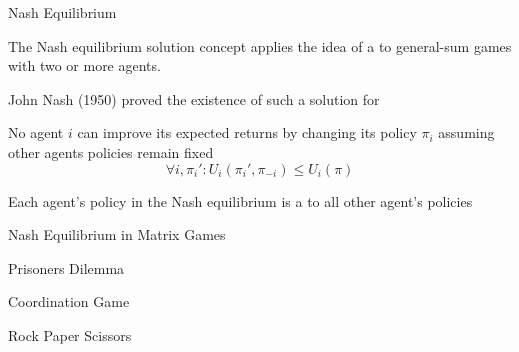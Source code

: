 \begin{frame}{Nash Equilibrium}

    The Nash equilibrium solution concept applies the idea of a  to general-sum games with two or more agents.
    \vspace{2pt}
    \blist
        \item John Nash (1950) proved the existence of such a solution for 
        \item No agent \(i\) can improve its expected returns by changing its policy \(\pi_i\) assuming other agents policies remain fixed
    \elist
    \vspace{2pt}
    \begin{equation*}
        \forall i , \pi_{i}': U_{i}(\pi_{i}', \pi_{-i}) \le U_{i}(\pi)
    \end{equation*}

    \blist
        \item Each agent's policy in the Nash equilibrium is a  to all other agent's policies
    \elist
        
\end{frame}

\begin{frame}{Nash Equilibrium in Matrix Games}

        \centering
        \begin{minipage}[bt]{0.32\textwidth}
            \centering
            \gamepd
            
            \vspace{5pt}
            Prisoners Dilemma
            
        \end{minipage}\hfill
        \begin{minipage}[bt]{0.32\textwidth}
            \centering
            \gamecoord
            
            \vspace{5pt}
            Coordination Game
            
        \end{minipage}\hfill
        \begin{minipage}[bt]{0.32\textwidth}
            \centering
            \gamerps
            
            \vspace{5pt}
            Rock Paper Scissors
            
        \end{minipage}
    
    

\end{frame}

